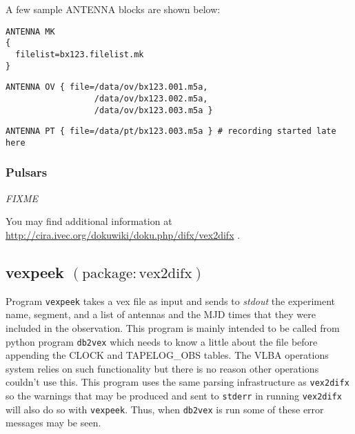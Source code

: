 A few sample ANTENNA blocks are shown below:

\begin{verbatim}
ANTENNA MK 
{
  filelist=bx123.filelist.mk
}
\end{verbatim}

\begin{verbatim}
ANTENNA OV { file=/data/ov/bx123.001.m5a, 
                  /data/ov/bx123.002.m5a,
                  /data/ov/bx123.003.m5a }
\end{verbatim}

\begin{verbatim}
ANTENNA PT { file=/data/pt/bx123.003.m5a } # recording started late here
\end{verbatim}


\subsubsection{Pulsars}

{\em FIXME}


You may find additional information at \url{http://cira.ivec.org/dokuwiki/doku.php/difx/vex2difx} .







\subsection{vexpeek {\small $\mathrm{(package: vex2difx)}$}} \label{sec:vexpeek}

Program {\tt vexpeek} takes a vex file as input and sends to {\em stdout} the experiment name, segment, and a list of antennas and the MJD times that they were included in the observation.
This program is mainly intended to be called from python program {\tt db2vex} which needs to know a little about the file before appending the CLOCK and TAPELOG\_OBS tables.  
The VLBA operations system relies on such functionality but there is no reason other operations couldn't use this.
This program uses the same parsing infrastructure as {\tt vex2difx} so the warnings that may be produced and sent to {\tt stderr} in running {\tt vex2difx} will also do so with {\tt vexpeek}.
Thus, when {\tt db2vex} is run some of these error messages may be seen.

